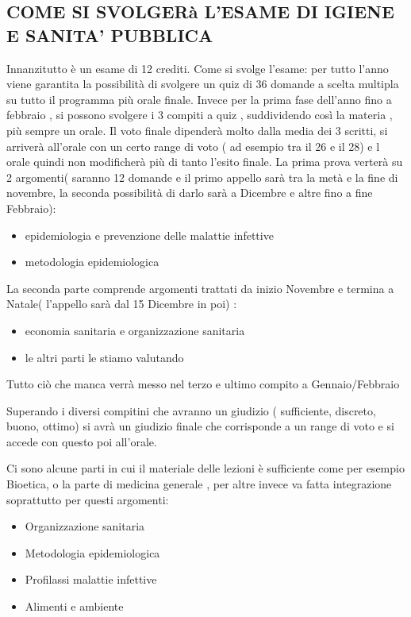 \subsection{COME SI SVOLGERà L'ESAME DI IGIENE E SANITA'  PUBBLICA}

Innanzitutto è un esame di 12 crediti. 
Come si svolge l’esame: per tutto l’anno viene garantita la possibilità di svolgere un quiz di 36 domande a scelta multipla su tutto il programma più orale finale. Invece per la prima fase dell’anno fino a febbraio , si possono svolgere i 3 compiti a quiz , suddividendo così la materia , più sempre un orale. Il voto finale dipenderà molto dalla media dei 3 scritti, si arriverà all’orale con un certo range di voto ( ad esempio tra il 26 e il 28) e l orale quindi non modificherà più di tanto l’esito finale.
La prima prova verterà su 2 argomenti( saranno 12 domande e il primo appello sarà tra la metà e la fine di novembre, la seconda possibilità di darlo sarà a Dicembre e altre fino a fine Febbraio):
\begin{itemize}

\item epidemiologia e prevenzione delle malattie infettive
\item metodologia epidemiologica
\end{itemize}
La seconda parte comprende argomenti trattati da inizio Novembre e termina a Natale( l’appello sarà dal 15 Dicembre in poi) :
\begin{itemize}

\item economia sanitaria e organizzazione sanitaria
\item le altri parti le stiamo valutando
\end{itemize}
Tutto ciò che manca verrà messo nel terzo e ultimo compito a Gennaio/Febbraio

Superando i diversi compitini che avranno un giudizio ( sufficiente, discreto, buono, ottimo) si avrà un giudizio finale che corrisponde a un range di voto e si accede con questo poi all’orale.

Ci sono alcune parti in cui il materiale delle lezioni è sufficiente come per esempio Bioetica, o la parte di medicina generale , per altre invece va fatta  integrazione soprattutto per questi argomenti:
\begin{itemize}

\item Organizzazione sanitaria
\item Metodologia epidemiologica
\item Profilassi malattie infettive
\item Alimenti e ambiente
\end{itemize}
